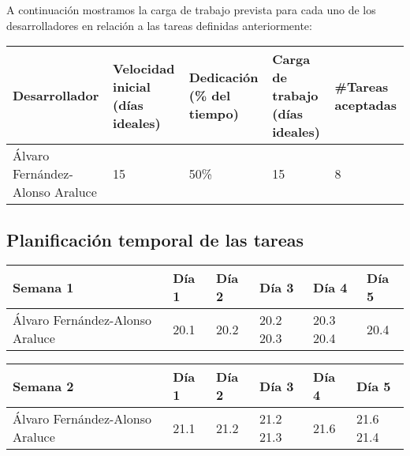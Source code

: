 A continuación mostramos la carga de trabajo prevista para cada uno de los desarrolladores en relación a las tareas definidas anteriormente:

\begin{table}[h]
	\centering
	\begin{tabular}{| p{3cm} | p{2cm} | p{2cm} | p{2cm} | p{2cm} |}
		\rowcolor[HTML]{329A9D} 
		{\color[HTML]{FFFFFF} \textbf{Desarrollador}} & {\color[HTML]{FFFFFF} \textbf{Velocidad inicial (días ideales)}} & {\color[HTML]{FFFFFF} \textbf{Dedicación (\% del tiempo)}} & {\color[HTML]{FFFFFF} \textbf{Carga de trabajo (días ideales)}} & {\color[HTML]{FFFFFF} \textbf{\#Tareas aceptadas}}  \\ \hline
		Álvaro Fernández-Alonso Araluce & 15 & 50\% & 15 & 8 \\ \hline
	\end{tabular}
\end{table}

\subsection{Planificación temporal de las tareas}

\begin{table}[h]
	\centering
	\begin{tabular}{| p{2cm} | p{2cm} | p{2cm} | p{2cm} | p{2cm} | p{2cm} |}
		\rowcolor[HTML]{329A9D} 
		 {\color[HTML]{FFFFFF} \textbf{Semana 1}} & {\color[HTML]{FFFFFF} \textbf{Día 1}} & {\color[HTML]{FFFFFF} \textbf{Día 2}} & {\color[HTML]{FFFFFF} \textbf{Día 3}} & {\color[HTML]{FFFFFF} \textbf{Día 4}}  & {\color[HTML]{FFFFFF} \textbf{Día 5}} \\ \hline
		Álvaro Fernández-Alonso Araluce & 20.1 & 20.2 & 20.2 20.3 & 20.3 20.4 & 20.4 \\ \hline
	\end{tabular}
\end{table}

\begin{table}[h]
	\centering
	\begin{tabular}{| p{2cm} | p{2cm} | p{2cm} | p{2cm} | p{2cm} | p{2cm} |}
		\rowcolor[HTML]{329A9D} 
		{\color[HTML]{FFFFFF} \textbf{Semana 2}} & {\color[HTML]{FFFFFF} \textbf{Día 1}} & {\color[HTML]{FFFFFF} \textbf{Día 2}} & {\color[HTML]{FFFFFF} \textbf{Día 3}} & {\color[HTML]{FFFFFF} \textbf{Día 4}}  & {\color[HTML]{FFFFFF} \textbf{Día 5}} \\ \hline
		Álvaro Fernández-Alonso Araluce & 21.1 & 21.2 & 21.2 21.3 & 21.6 & 21.6 21.4 \\ \hline
	\end{tabular}
\end{table}

